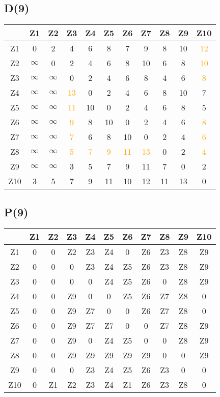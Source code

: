 \documentclass[a4paper,11pt]{article}
\begin{document}
\subsection*{D(9)}
\begin{center}
\begin{tabular}{c|cccccccccc}
 & Z1 & Z2 & Z3 & Z4 & Z5 & Z6 & Z7 & Z8 & Z9 & Z10 \\ \hline
Z1 & 0 & 2 & 4 & 6 & 8 & 7 & 9 & 8 & 10 & \textcolor{orange}{12} \\
Z2 & $\infty$ & 0 & 2 & 4 & 6 & 8 & 10 & 6 & 8 & \textcolor{orange}{10} \\
Z3 & $\infty$ & $\infty$ & 0 & 2 & 4 & 6 & 8 & 4 & 6 & \textcolor{orange}{8} \\
Z4 & $\infty$ & $\infty$ & \textcolor{orange}{13} & 0 & 2 & 4 & 6 & 8 & 10 & 7 \\
Z5 & $\infty$ & $\infty$ & \textcolor{orange}{11} & 10 & 0 & 2 & 4 & 6 & 8 & 5 \\
Z6 & $\infty$ & $\infty$ & \textcolor{orange}{9} & 8 & 10 & 0 & 2 & 4 & 6 & \textcolor{orange}{8} \\
Z7 & $\infty$ & $\infty$ & \textcolor{orange}{7} & 6 & 8 & 10 & 0 & 2 & 4 & \textcolor{orange}{6} \\
Z8 & $\infty$ & $\infty$ & \textcolor{orange}{5} & \textcolor{orange}{7} & \textcolor{orange}{9} & \textcolor{orange}{11} & \textcolor{orange}{13} & 0 & 2 & \textcolor{orange}{4} \\
Z9 & $\infty$ & $\infty$ & 3 & 5 & 7 & 9 & 11 & 7 & 0 & 2 \\
Z10 & 3 & 5 & 7 & 9 & 11 & 10 & 12 & 11 & 13 & 0 \\
\end{tabular}
\end{center}
\subsection*{P(9)}
\begin{center}
\begin{tabular}{c|cccccccccc}
 & Z1 & Z2 & Z3 & Z4 & Z5 & Z6 & Z7 & Z8 & Z9 & Z10 \\ \hline
Z1 & 0 & 0 & Z2 & Z3 & Z4 & 0 & Z6 & Z3 & Z8 & Z9 \\
Z2 & 0 & 0 & 0 & Z3 & Z4 & Z5 & Z6 & Z3 & Z8 & Z9 \\
Z3 & 0 & 0 & 0 & 0 & Z4 & Z5 & Z6 & 0 & Z8 & Z9 \\
Z4 & 0 & 0 & Z9 & 0 & 0 & Z5 & Z6 & Z7 & Z8 & 0 \\
Z5 & 0 & 0 & Z9 & Z7 & 0 & 0 & Z6 & Z7 & Z8 & 0 \\
Z6 & 0 & 0 & Z9 & Z7 & Z7 & 0 & 0 & Z7 & Z8 & Z9 \\
Z7 & 0 & 0 & Z9 & 0 & Z4 & Z5 & 0 & 0 & Z8 & Z9 \\
Z8 & 0 & 0 & Z9 & Z9 & Z9 & Z9 & Z9 & 0 & 0 & Z9 \\
Z9 & 0 & 0 & 0 & Z3 & Z4 & Z5 & Z6 & Z3 & 0 & 0 \\
Z10 & 0 & Z1 & Z2 & Z3 & Z4 & Z1 & Z6 & Z3 & Z8 & 0 \\
\end{tabular}
\end{center}
\newpage
\end{document}
